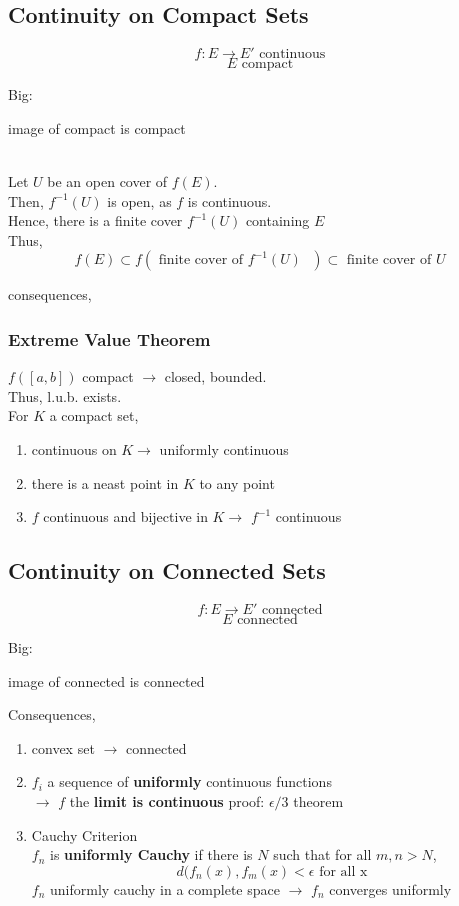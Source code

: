 \documentclass[12pt]{article}
\begin{document}
\begin{itemize}
\subsection*{Continuity on Compact Sets}
$$f: E \rightarrow E' \text{ continuous}$$
$$E \text{ compact}$$

Big: \\
\centerline{image of compact is compact }
\ \\
\textcolor[gray]{0.5}{
\noindent Let $U$ be an open cover of $f(E)$. \\
Then, $f^{-1}(U)$ is open, as $f$ is continuous.\\
Hence, there is a finite cover $f^{-1}(U)$ containing $E$\\
Thus, 
$$f(E) \subset f(\text{ finite cover of $f^{-1}(U)$ }) \subset \text{ finite cover of } U$$ }

\noindent consequences, 
\subsubsection*{Extreme Value Theorem}
\textcolor[gray]{0.5}{$f([a, b])$ compact $\rightarrow$ closed, bounded. \\
Thus, l.u.b. exists.}
\ \\
\noindent For $K$ a compact set, 

\begin{enumerate}
    \item continuous on $K \rightarrow$ uniformly continuous
    \item there is a neast point in $K$ to any point
    \item $f$ continuous and bijective in $K \rightarrow$ $f^{-1}$ continuous
\end{enumerate}


\subsection*{Continuity on Connected Sets}

$$f: E \rightarrow E' \text{ connected}$$
$$E \text{ connected}$$

Big: \\
\centerline{image of connected is connected}

Consequences, 
\begin{enumerate}
    \item convex set $\rightarrow$ connected
    \item $f_i$ a sequence of \textbf{uniformly} continuous functions\\ 
$\rightarrow$ $f$ the \textbf{limit is continuous}
\textcolor[gray]{0.5}{proof: $\epsilon / 3$ theorem}
    \item Cauchy Criterion \\
    $f_n$ is \textbf{uniformly Cauchy} if there is $N$ such that for all $m, n >N$, 
$$d(f_n(x), f_m(x) < \epsilon \text{ for all x}$$
$f_n$ uniformly cauchy in a complete space $\rightarrow$ $f_n$ converges uniformly 


\end{enumerate}
\end{itemize}
\end{document}
